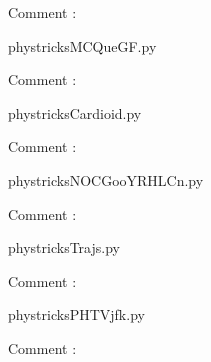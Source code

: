     Comment : 

    \clearpage
    


    \newcommand{\CaptionFigMCQueGF}{<+Type your caption here+>}
    \begin{center}
        
    \end{center}
    phystricksMCQueGF.py

    Comment : 

    \clearpage
    


    \newcommand{\CaptionFigCardioid}{<+Type your caption here+>}
    \begin{center}
        
    \end{center}
    phystricksCardioid.py

    Comment : 

    \clearpage
    


    \newcommand{\CaptionFigNOCGooYRHLCn}{<+Type your caption here+>}
    \begin{center}
        
    \end{center}
    phystricksNOCGooYRHLCn.py

    Comment : 

    \clearpage
    


    \newcommand{\CaptionFigTrajs}{<+Type your caption here+>}
    \begin{center}
        
    \end{center}
    phystricksTrajs.py

    Comment : 

    \clearpage
    


    \newcommand{\CaptionFigPHTVjfk}{<+Type your caption here+>}
    \begin{center}
        
    \end{center}
    phystricksPHTVjfk.py

    Comment : 

    \clearpage
    


